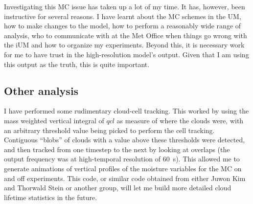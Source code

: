 \documentclass[11pt,a4paper]{article}
\begin{document}
Investigating this MC issue has taken up a lot of my time. It has, however, been instructive for several reasons. I have learnt about the MC schemes in the UM, how to make changes to the model, how to perform a reasonably wide range of analysis, who to communicate with at the Met Office when things go wrong with the iUM and how to organize my experiments. Beyond this, it is necessary work for me to have trust in the high-resolution model's output. Given that I am using this output as the truth, this is quite important. 


\subsection{Other analysis}

I have performed some rudimentary cloud-cell tracking. This worked by using the mass weighted vertical integral of $qcl$ as measure of where the clouds were, with an arbitrary threshold value being picked to perform the cell tracking. Contiguous ``blobs'' of clouds with a value above these thresholds were detected, and then tracked from one timestep to the next by looking at overlaps (the output frequency was at high-temporal resolution of \SI{60}{s}). This allowed me to generate animations of vertical profiles of the moisture variables for the MC on and off experiments. This code, or similar code obtained from either Juwon Kim and Thorwald Stein or another group, will let me build more detailed cloud lifetime statistics in the future. 

\end{document}
